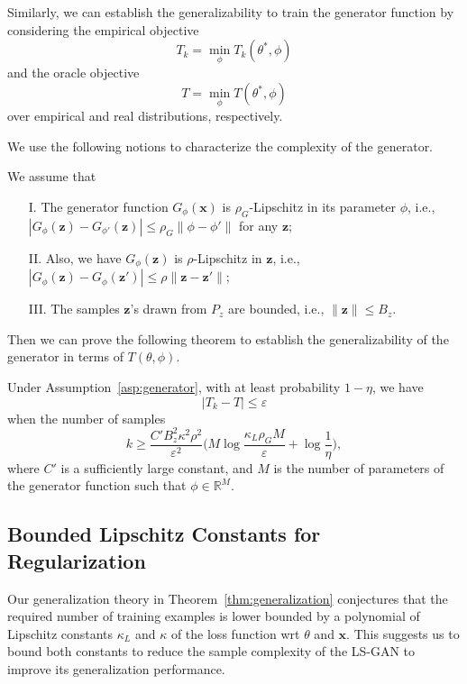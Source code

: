 

Similarly, we can establish the generalizability to train the generator function by considering the empirical objective
$$
T_k = \min_{\phi} T_k(\theta^*,\phi)
$$
and the oracle objective
$$
T = \min_\phi T(\theta^*,\phi)
$$
over empirical and real distributions, respectively.

We use the following notions to characterize the complexity of the generator.
\begin{assumption}\label{asp:generator}
We assume that
\begin{itemize}
\item[I.] The generator function $G_\phi(\mathbf x)$ is $\rho_G$-Lipschitz in its parameter $\phi$, i.e., $|G_\phi(\mathbf z)-G_{\phi'}(\mathbf z)|\leq \rho_G\|\phi-\phi'\|$ for any $\mathbf z$;
\item[II.] Also, we have $G_\phi(\mathbf z)$ is $\rho$-Lipschitz in $\mathbf z$, i.e., $|G_\phi(\mathbf z)-G_\phi(\mathbf z')|\leq\rho\|\mathbf z-\mathbf z'\|$;
\item[III.] The samples $\mathbf z$'s drawn from $P_z$ are bounded, i.e., $\|\mathbf z\|\leq B_z$.
\end{itemize}
\end{assumption}

Then we can prove the following theorem to establish the generalizability of the generator in terms of $T(\theta,\phi)$.
\begin{theorem}%
Under Assumption~\ref{asp:generator}, with at least probability $1-\eta$, we have
$$
|T_k - T|\leq \varepsilon
$$
when the number of samples
$$
k\geq\dfrac{C' B_z^2\kappa^2\rho^2}{\varepsilon^2} \big(M\log\dfrac{\kappa_L \rho_G M}{\varepsilon}+\log\dfrac{1}{\eta}\big),
$$
where $C'$ is a sufficiently large constant, and $M$ is the number of parameters of the generator function such that $\phi\in\mathbb R^M$.
\end{theorem}

\subsection{Bounded Lipschitz Constants for Regularization}

Our generalization theory  in Theorem~\ref{thm:generalization} conjectures that the required number of training examples is lower bounded by a polynomial of Lipschitz constants $\kappa_L$ and $\kappa$ of the loss function wrt $\theta$ and $\mathbf x$. This suggests us to bound both constants to reduce the sample complexity of the LS-GAN to improve its generalization performance.

